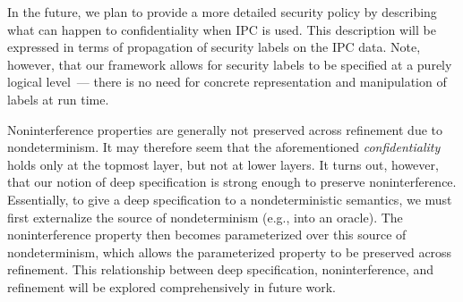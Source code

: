 {In the future, we plan to provide a more detailed security policy by
describing what can happen to confidentiality when IPC is used.  This
description will be expressed in terms of propagation of security
labels on the IPC data. Note, however, that our framework allows for
security labels to be specified at a purely logical level~--- there is
no need for concrete representation and manipulation of labels at run
time.

Noninterference properties are generally not preserved across
refinement due to nondeterminism. It may therefore seem that the
aforementioned \emph{confidentiality} holds only at the topmost layer,
but not at lower layers. It turns out, however, that our notion of
deep specification is strong enough to preserve
noninterference. Essentially, to give a deep specification to a
nondeterministic semantics, we must first externalize the source of
nondeterminism (e.g., into an oracle). The noninterference property
then becomes parameterized over this source of nondeterminism, which
allows the parameterized property to be preserved across
refinement. This relationship between deep specification,
noninterference, and refinement will be explored comprehensively in
future work.
}
